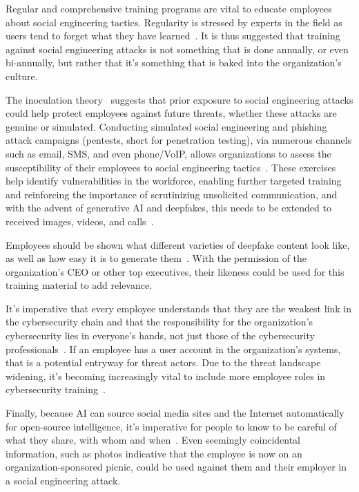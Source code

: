 Regular and comprehensive training programs are vital to educate employees about social engineering tactics. Regularity is stressed by experts in the field as users tend to forget what they have learned~\citep{hadnagy_Social_Engineering_The_Science_2018, mitnick_The_Art_of_Deception_2003}. It is thus suggested that training against social engineering attacks is not something that is done annually, or even bi-annually, but rather that it's something that is baked into the organization's culture. 

The inoculation theory~\citep{blauth_AI_Crime_Overview_Malicious_Use_Abuse_2022} suggests that prior exposure to social engineering attacks could help protect employees against future threats, whether these attacks are genuine or simulated. Conducting simulated social engineering and phishing attack campaigns (pentests, short for penetration testing), via numerous channels such as email, SMS, and even phone/VoIP, allows organizations to assess the susceptibility of their employees to social engineering tactics~\citep{hadnagy_Social_Engineering_The_Science_2018}. These exercises help identify vulnerabilities in the workforce, enabling further targeted training and reinforcing the importance of scrutinizing unsolicited communication, and with the advent of generative AI and deepfakes, this needs to be extended to received images, videos, and calls~\citep{mirsky_Creation_Detection_Deepfakes_2021}.

Employees should be shown what different varieties of deepfake content look like, as well as how easy it is to generate them~\citep{mirsky_Creation_Detection_Deepfakes_2021}. With the permission of the organization’s CEO or other top executives, their likeness could be used for this training material to add relevance.

It's imperative that every employee understands that they are the weakest link in the cybersecurity chain and that the responsibility for the organization's cybersecurity lies in everyone's hands, not just those of the cybersecurity professionals~\citep{mitnick_The_Art_of_Deception_2003}. If an employee has a user account in the organization’s systems, that is a potential entryway for threat actors. Due to the threat landscape widening, it's becoming increasingly vital to include more employee roles in cybersecurity training~\citep{ibm_Cost_Data_Breach_Report_2024}.

Finally, because AI can source social media sites and the Internet automatically for open-source intelligence, it's imperative for people to know to be careful of what they share, with whom and when~\citep{mitnick_The_Art_of_Deception_2003}. Even seemingly coincidental information, such as photos indicative that the employee is now on an organization-sponsored picnic, could be used against them and their employer in a social engineering attack.
